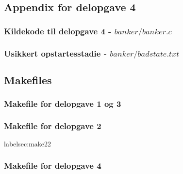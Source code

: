 \documentclass[main.tex]{subfile}
\begin{document}
\subsection{Appendix for delopgave 4}
\subsubsection{Kildekode til delopgave 4 - $banker/banker.c$}
\label{sec:banker}
\pagebreak
\subsubsection{Usikkert opstartesstadie - $banker/badstate.txt$}
\label{sec:badstate}
\pagebreak

\subsection{Makefiles}
\subsubsection{Makefile for delopgave 1 og 3}\label{sec:make21}\label{sec:make23}


\subsubsection{Makefile for delopgave 2}label{sec:make22}
\

\subsubsection{Makefile for delopgave 4}\label{sec:make24}

\end{document}
